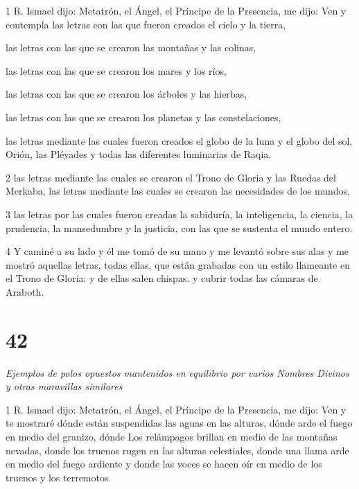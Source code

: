 \par 1 R. Ismael dijo: Metatrón, el Ángel, el Príncipe de la Presencia, me dijo: Ven y contempla las letras con las que fueron creados el cielo y la tierra,
\par las letras con las que se crearon las montañas y las colinas,
\par las letras con las que se crearon los mares y los ríos,
\par las letras con las que se crearon los árboles y las hierbas,
\par las letras con las que se crearon los planetas y las constelaciones,
\par las letras mediante las cuales fueron creados el globo de la luna y el globo del sol, Orión, las Pléyades y todas las diferentes luminarias de Raqia.

\par 2 las letras mediante las cuales se crearon el Trono de Gloria y las Ruedas del Merkaba, las letras mediante las cuales se crearon las necesidades de los mundos,

\par 3 las letras por las cuales fueron creadas la sabiduría, la inteligencia, la ciencia, la prudencia, la mansedumbre y la justicia, con las que se sustenta el mundo entero.

\par 4 Y caminé a su lado y él me tomó de su mano y me levantó sobre sus alas y me mostró aquellas letras, todas ellas, que están grabadas con un estilo llameante en el Trono de Gloria: y de ellas salen chispas. y cubrir todas las cámaras de Araboth.


\chapter{42}

\par \textit{Ejemplos de polos opuestos mantenidos en equilibrio por varios Nombres Divinos y otras maravillas similares}

\par 1 R. Ismael dijo: Metatrón, el Ángel, el Príncipe de la Presencia, me dijo: Ven y te mostraré dónde están suspendidas las aguas en las alturas, dónde arde el fuego en medio del granizo, dónde Los relámpagos brillan en medio de las montañas nevadas, donde los truenos rugen en las alturas celestiales, donde una llama arde en medio del fuego ardiente y donde las voces se hacen oír en medio de los truenos y los terremotos.

